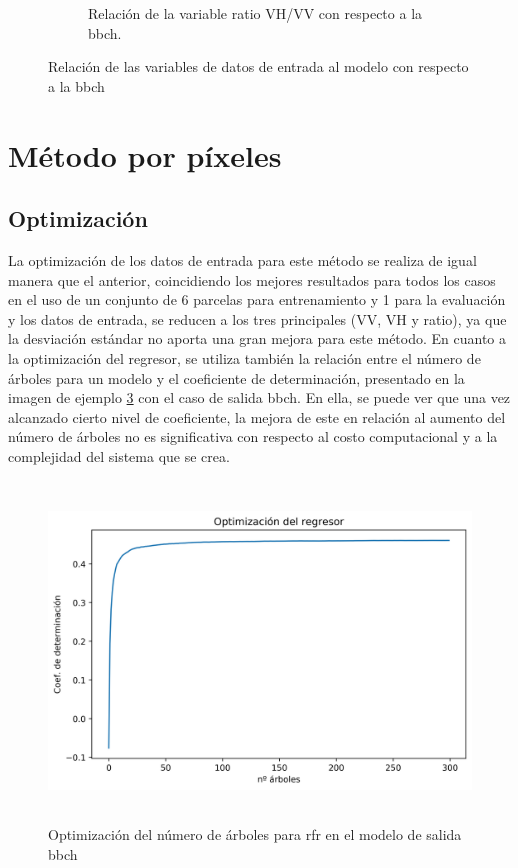 \begin{figure}[H]
\begin{subfigure}{.45\textwidth}
  \caption{Relación de la variable ratio VH/VV con respecto a la \gls{bbch}.\label{fig:RATIO}}
\end{subfigure}
\caption{Relación de las variables de datos de entrada al modelo con respecto a la \gls{bbch} \label{fig:rel_param}}
\end{figure}

\section{Método por píxeles} 
\subsection{Optimización}
\par La optimización de los datos de entrada para este método se realiza de igual manera que el anterior, coincidiendo los mejores resultados para todos los casos en el uso de un conjunto de 6 parcelas para entrenamiento y 1 para la evaluación y los datos de entrada, se reducen a los tres principales (VV, VH y ratio), ya que la desviación estándar no aporta una gran mejora para este método. En cuanto a la optimización del regresor, se utiliza también la relación entre el número de árboles para un modelo y el coeficiente de determinación, presentado en la imagen de ejemplo \ref{fig:opt_pixl} con el caso de salida \gls{bbch}. En ella, se puede ver que una vez alcanzado cierto nivel de coeficiente, la mejora de este en relación al aumento del número de árboles no es significativa con respecto al costo computacional y a la complejidad del sistema que se crea. 
\begin{figure}[h]
    \centering
    \includegraphics[height=9cm]{archivos/tfg/Pixel/opt_tree_bbch_pixel} 
    \caption{Optimización del número de árboles para \gls{rfr} en el modelo de salida \gls{bbch}}
    \label{fig:opt_pixl}
\end{figure}

